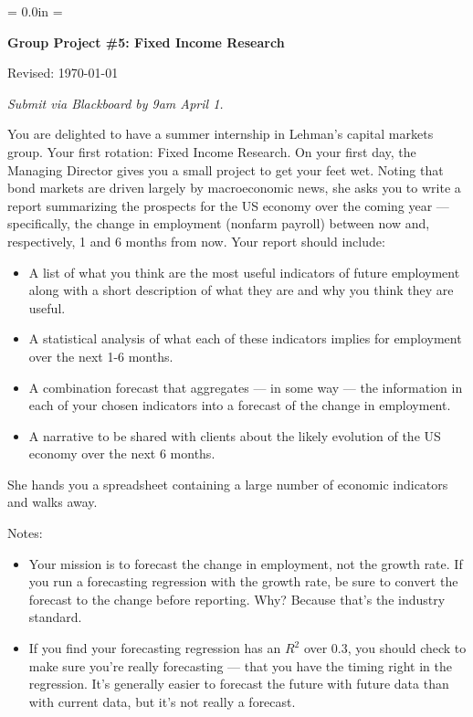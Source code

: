 \documentclass[letterpaper,12pt]{article}
\def\HeadName{Group Project \#5}
\begin{document}
\parindent = 0.0in
\parskip = \bigskipamount
\thispagestyle{empty}%
\Head

\centerline{\large \bf \HeadName:  Fixed Income Research}%
\centerline{Revised:  \today}

\medskip
{\it Submit via Blackboard by 9am April 1.}
\medskip

You are delighted to have a summer internship in Lehman's capital markets group.  
Your first rotation:  Fixed Income Research.  
On your first day, the Managing Director gives you 
a small project to get your feet wet. 
Noting that bond markets are driven largely by macroeconomic news, 
she asks you to write a report summarizing the prospects for the US 
economy over the coming year --- specifically, 
the change in employment (nonfarm payroll) between now and, respectively, 
1 and 6 months from now. 
Your report should include:  
%
\begin{itemize}

\item A list of what you think are the most useful indicators
of future employment 
along with a short description of what they are and why you think they 
are useful.  

\item A statistical analysis of what each of these indicators implies  
for employment over the next 1-6 months.  

\item A combination forecast that aggregates  --- in some way --- 
the information in each of your chosen indicators into a 
forecast of the change in employment.  

\item A narrative to be shared with clients 
about the likely evolution of the US economy over the next 6 months.  
\end{itemize}
%
She hands you a spreadsheet containing a large number of 
economic indicators and walks away.  

Notes: 
\begin{itemize}
\item Your mission is to forecast the change in employment, 
not the growth rate.
If you run a forecasting regression with the growth rate, 
be sure to convert the forecast to the change before reporting.  
Why?  Because that's the industry standard.   
\item If you find your forecasting regression has an $R^2$ over 0.3, 
you should check to make sure you're really forecasting --- that you
have the timing right in the regression.
It's generally easier to forecast the future with future data
than with current data, but it's not really a forecast. 
\end{itemize}
\end{document}
